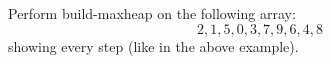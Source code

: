 Perform build-maxheap on the following array:
\[
2,1,5,0,3,7,9,6,4,8
\]
showing every step (like in the above example).
